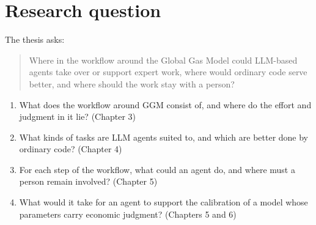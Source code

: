 \section{Research question}


The thesis asks:

\begin{quote}
Where in the workflow around the Global Gas Model could LLM-based agents take over or support expert work, where would ordinary code serve better, and where should the work stay with a person?
\end{quote}

\begin{enumerate}
  \item What does the workflow around GGM consist of, and where do the effort and judgment in it lie? (Chapter 3)
  \item What kinds of tasks are LLM agents suited to, and which are better done by ordinary code? (Chapter 4)
  \item For each step of the workflow, what could an agent do, and where must a person remain involved? (Chapter 5)
  \item What would it take for an agent to support the calibration of a model whose parameters carry economic judgment? (Chapters 5 and 6)
\end{enumerate}
